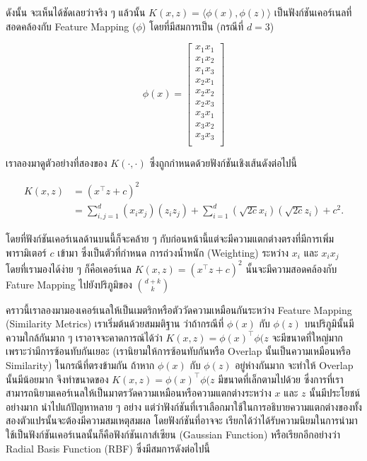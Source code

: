 \noindent ดังนั้น จะเห็นได้ชัดเลยว่าจริง ๆ แล้วนั้น $K(x,z) = \langle\phi(x),\phi(z)\rangle$ เป็นฟังก์ชันเคอร์เนลที่สอดคล้องกับ
Feature Mapping ($\phi$) โดยที่มีสมการเป็น (กรณีที่ $d = 3$)

\begin{equation}
    \phi(x) = \begin{bmatrix}
    x_1 x_1\\
    x_1 x_2\\
    x_1 x_3\\
    x_2 x_1\\
    x_2 x_2\\
    x_2 x_3\\
    x_3 x_1\\
    x_3 x_2\\
    x_3 x_3\\
    \end{bmatrix}
\end{equation}

เราลองมาดูตัวอย่างที่สองของ $K(\cdot,\cdot)$ ซึ่งถูกกำหนดด้วยฟังก์ชันเชิงเส้นดังต่อไปนี้

\begin{align}
    K(x,z) &= (x^{\top} z + c)^2\\
    &= \sum_{i,j=1}^d (x_i x_j)(z_i z_j) + \sum_{i=1}^d \left(\sqrt{2c}x_i\right) \left(\sqrt{2c}z_i\right) + c^2.
\end{align}

\noindent โดยที่ฟังก์ชันเคอร์เนลด้านบนนี้ก็จะคล้าย ๆ กับก่อนหน้านี้แต่จะมีความแตกต่างตรงที่มีการเพิ่มพารามิเตอร์ $c$ เข้ามา ซึ่งเป็นตัวที่กำหนด%
การถ่วงน้ำหนัก (Weighting) ระหว่าง $x_{i}$ และ $x_{i}x_{j}$ โดยที่เรามองได้ง่าย ๆ ก็คือเคอร์เนล $K(x,z) = (x^{\top} z + c)^2$
นั้นจะมีความสอดคล้องกับ Fature Mapping ไปยังปริภูมิของ $\binom{d+k}{k}$

คราวนี้เราลองมามองเคอร์เนลให้เป็นเมตริกหรือตัววัดความเหมือนกันระหว่าง Feature Mapping (Similarity Metrics) เราเริ่มต้นด้วยสมมติฐาน%
ว่าถ้ากรณีที่ $\phi(x)$ กับ $\phi(z)$ บนปริภูมินั้นมีความใกล้กันมาก ๆ เราอาจจะคาดการณ์ได้ว่า $K(x,z) = \phi(x)^{\top} \phi(z$
จะมีขนาดที่ใหญ่มากเพราะว่ามีการซ้อนทับกันเยอะ (เรานิยามให้การซ้อนทับกันหรือ Overlap นั้นเป็นความเหมือนหรือ Similarity) ในกรณีที่ตรงข้ามกัน
ถ้าหาก $\phi(x)$ กับ $\phi(z)$ อยู่ห่างกันมาก จะทำให้ Overlap นั้นมีน้อยมาก จึงทำขนาดของ $K(x,z) = \phi(x)^{\top} \phi(z$ 
มีขนาดที่เล็กตามไปด้วย ซึ่งการที่เราสามารถนิยามเคอร์เนลให้เป็นมาตรวัดความเหมือนหรือความแตกต่างระหว่าง $x$ และ $z$ นั้นมีประโยชน์อย่างมาก%
นำไปแก้ปัญหาหลาย ๆ อย่าง แต่ว่าฟังก์ชันที่เราเลือกมาใช้ในการอธิบายความแตกต่างของทั้งสองตัวแปรนั้นจะต้องมีความสมเหตุสมผล โดยฟังก์ชันที่อาจจะ%
เรียกได้ว่าได้รับความนิยมในการนำมาใช้เป็นฟังก์ชันเคอร์เนลนั้นก็คือฟังก์ชันเกาส์เซียน (Gaussian Function) หรือเรียกอีกอย่างว่า Radial Basis
Function (RBF) ซึ่งมีสมการดังต่อไปนี้ 

